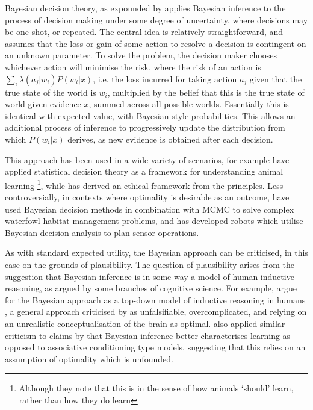 Bayesian decision theory, as expounded by \citet{Robbins1964} applies
Bayesian inference to the process of decision making under some degree
of uncertainty, where decisions may be one-shot, or repeated.
The central idea is relatively straightforward, and assumes that the
loss or gain of some action to resolve a decision is contingent on
an unknown parameter. To solve the problem, the decision maker chooses
whichever action will minimise the risk, where the risk of an action
is $\underset{i}{\sum}\lambda(a_{j}|w_{i})P(w_{i}|x)$, i.e. the loss
incurred for taking action $a_{j}$ given that the true state of the
world is $w_{i}$, multiplied by the belief that this is the true
state of world given evidence $x$, summed across all possible worlds.
Essentially this is identical with expected value, with Bayesian style
probabilities. This allows an additional process of inference to progressively
update the distribution from which $P(w_{i}|x)$ derives, as new evidence
is obtained after each decision. 

This approach has been used in a wide variety of scenarios, for example
\citet{McNamara1980} have applied statistical decision theory as
a framework for understanding animal learning%
\footnote{Although they note that this is in the sense of how animals `should'
learn, rather than how they do learn%
}, while \citet{Harsanyi1978} has derived an ethical framework from
the principles. Less controversially, in contexts where optimality
is desirable as an outcome, \citet{Survey2003} have used Bayesian
decision methods in combination with \ac{MCMC} to solve complex waterfowl
habitat management problems, and \citet{Kristensen1997} has developed
robots which utilise Bayesian decision analysis to plan sensor operations.

As with standard expected utility, the Bayesian approach can be criticised,
in this case on the grounds of plausibility. The question of plausibility
arises from the suggestion that Bayesian inference is in some way
a model of human inductive reasoning, as argued by some branches of
cognitive science. For example, \citeauthor{Tenenbaum2006} argue
for the Bayesian approach as a top-down model of inductive reasoning
in humans \citep{Tenenbaum2006,Griffiths2010}, a general approach
criticised by \citet{Bowers2012} as unfalsifiable, overcomplicated,
and relying on an unrealistic conceptualisation of the brain as optimal.
\citet{Miller2012} also applied similar criticism to claims by \citet{Gallistel2012}
that Bayesian inference better characterises learning as opposed to
associative conditioning type models, suggesting that this relies
on an assumption of optimality which is unfounded.


